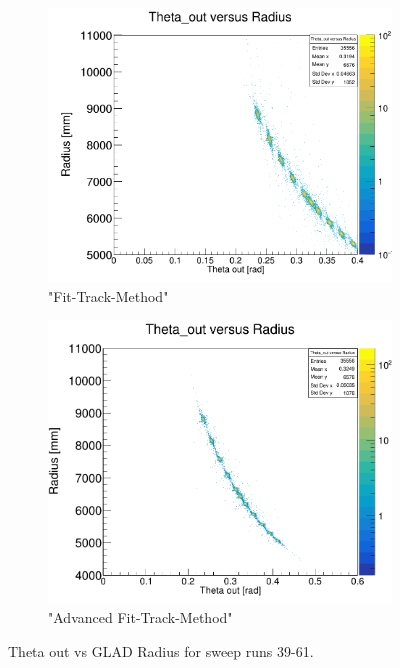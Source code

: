 \documentclass[12pt, letterpaper]{article}
\begin{document}
\begin{figure}[!htbp]
\begin{subfigure}{.5\textwidth}
\end{subfigure}
\begin{subfigure}{.5\textwidth}
  \centering
  \includegraphics[width=.9\linewidth]{plot_imgs/theta_out_rho_fit.png} 
  \caption{"Fit-Track-Method"}
  \label{fig:sub-second}
\end{subfigure}
\begin{subfigure}{.5\textwidth}
  \centering
  \includegraphics[width=.9\linewidth]{plot_imgs/theta_out_rho_alpha.png} 
  \caption{"Advanced Fit-Track-Method"}
  \label{fig:sub-second}
\end{subfigure}
\caption{Theta \textunderscore out vs GLAD Radius for sweep runs 39-61.}
\label{fig:fig}
\end{figure}
\FloatBarrier
\clearpage
\end{document}
